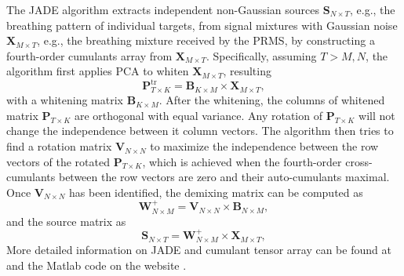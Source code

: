 The JADE algorithm extracts independent non-Gaussian sources $\mathbf{S}_{N \times T}$, e.g., the breathing pattern of individual targets, from signal mixtures with Gaussian noise $\mathbf{X}_{M \times T}$, e.g., the breathing mixture received by the PRMS, by constructing a fourth-order cumulants array from $\mathbf{X}_{M \times T}$. Specifically, assuming $T > M,N$, the algorithm first applies PCA to whiten $\mathbf{X}_{M \times T}$, resulting
\[
\mathbf{P}^{\text{tr}}_{T \times K} = \mathbf{B}_{K \times M} \times \mathbf{X}_{M \times T},
\]
with a whitening matrix $\mathbf{B}_{K \times M}$.
After the whitening, the columns of whitened matrix $\mathbf{P}_{T \times K}$ are orthogonal with equal variance. Any rotation of $\mathbf{P}_{T \times K}$ will not change the independence between it column vectors. The algorithm then tries to find a rotation matrix $\mathbf{V}_{N \times N}$ to maximize the independence between the row vectors of the rotated $\mathbf{P}_{T \times K}$, which is achieved when the fourth-order cross-cumulants between the row vectors are zero and their auto-cumulants maximal. Once $\mathbf{V}_{N \times N}$ has been identified, the demixing matrix can be computed as 
\[
    \mathbf{W}^{+}_{N \times M} = \mathbf{V}_{N \times N} \times \mathbf{B}_{N \times M},
\]
and the source matrix as
\[
    \mathbf{S}_{N \times T} = \mathbf{W}^{+}_{N \times M} \times \mathbf{X}_{M \times T},
\]
More detailed information on JADE and cumulant tensor array can be found at \cite{rutledge_independent_2013} and the Matlab code on the website \cite{CardosoBlindSeparationReal}.
 
 
 
